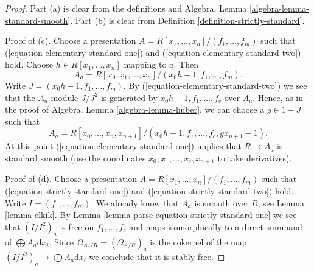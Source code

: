 \begin{proof}
Part (a) is clear from the definitions and
Algebra, Lemma \ref{algebra-lemma-standard-smooth}.
Part (b) is clear from Definition \ref{definition-strictly-standard}.

\medskip\noindent
Proof of (c). Choose a presentation
$A = R[x_1, \ldots, x_n]/(f_1, \ldots, f_m)$ such that
(\ref{equation-elementary-standard-one}) and
(\ref{equation-elementary-standard-two}) hold.
Choose $h \in R[x_1, \ldots, x_n]$ mapping to $a$. Then
$$
A_a = R[x_0, x_1, \ldots, x_n]/(x_0h - 1, f_1, \ldots, f_m).
$$
Write $J = (x_0h - 1, f_1, \ldots, f_m)$.
By (\ref{equation-elementary-standard-two}) we see that the $A_a$-module
$J/J^2$ is generated by $x_0h - 1, f_1, \ldots, f_c$
over $A_a$. Hence, as in the proof of Algebra, Lemma \ref{algebra-lemma-huber},
we can choose a $g \in 1 + J$ such that
$$
A_a = R[x_0, \ldots, x_n, x_{n + 1}]/
(x_0h - 1, f_1, \ldots, f_c, gx_{n + 1} - 1).
$$
At this point (\ref{equation-elementary-standard-one})
implies that $R \to A_a$ is standard smooth (use the coordinates
$x_0, x_1, \ldots, x_c, x_{n + 1}$ to take derivatives).

\medskip\noindent
Proof of (d). Choose a presentation
$A = R[x_1, \ldots, x_n]/(f_1, \ldots, f_m)$ such that
(\ref{equation-strictly-standard-one}) and
(\ref{equation-strictly-standard-two}) hold.
Write $I = (f_1, \ldots, f_m)$.
We already know that $A_a$ is smooth over $R$, see
Lemma \ref{lemma-elkik}. By
Lemma \ref{lemma-parse-equation-strictly-standard-one}
we see that $(I/I^2)_a$ is free on $f_1, \ldots, f_c$
and maps isomorphically to a direct summand of
$\bigoplus A_a \text{d}x_i$. Since
$\Omega_{A_a/R} = (\Omega_{A/R})_a$
is the cokernel of the map
$(I/I^2)_a \to \bigoplus A_a \text{d}x_i$
we conclude that it is stably free.


\end{proof}
